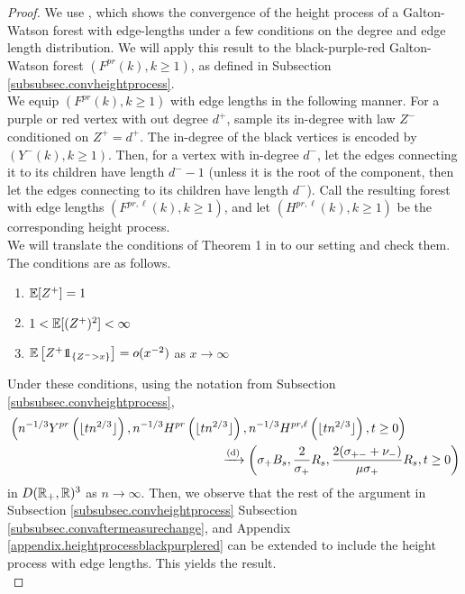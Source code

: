 \begin{proof}
We use \citet[Theorem 1]{deraphelisScalingLimitMultitype2017}, which shows the convergence of the height process of a Galton-Watson forest with edge-lengths under a few conditions on the degree and edge length distribution. We will apply this result to the black-purple-red Galton-Watson forest $(F^{pr}(k),k\geq 1)$, as defined in Subsection \ref{subsubsec.convheightprocess}. \\
We equip $(F^{pr}(k),k\geq 1)$ with edge lengths in the following manner. For a purple or red vertex with out degree $d^+$, sample its in-degree with law $Z^-$ conditioned on $Z^+=d^+$. The in-degree of the black vertices is encoded by $(Y^{-}(k),k\geq 1)$.  Then, for a vertex with in-degree $d^-$, let the edges connecting it to its children have length $d^--1$ (unless it is the root of the component, then let the edges connecting to its children have length $d^-$). Call the resulting forest with edge lengths $(F^{pr,\ell}(k),k\geq 1)$, and let $(H^{pr,\ell}(k),k\geq 1)$ be the corresponding height process.\\
We will translate the conditions of Theorem 1 in \cite{deraphelisScalingLimitMultitype2017} to our setting and check them. The conditions are as follows.
\begin{enumerate}
    \item ${\mathbb E}[Z^+]=1$
    \item $1<{\mathbb E}[(Z^+)^2]<\infty$
    \item $\E\left[Z^+\one_{\{Z^->x\}}\right]=o(x^{-2})$ as $x\to \infty$
\end{enumerate}
Under these conditions, using the notation from Subsection \ref{subsubsec.convheightprocess},
\begin{align}
    \label{eq.convmodifiedheightprocess}
    &\left(n^{-1/3}Y^{pr}\left(\lfloor t n^{2/3}\rfloor \right),n^{-1/3}H^{pr}\left(\lfloor t n^{2/3}\rfloor \right), n^{-1/3}H^{pr,\ell}\left(\lfloor t n^{2/3}\rfloor \right),t\geq 0\right) \nonumber \\
    &\hspace{17em} \todist\left(\sigma_+ B_s, \frac{2}{\sigma_+}R_s, \frac{2(\sigma_{+-}+\nu_-)}{\mu\sigma_+}R_s,t\geq 0\right)
\end{align}
in $D({\mathbb R}_+,{\mathbb R})^3$ as $n\to \infty$. 
Then, we observe that the rest of the argument in Subsection \ref{subsubsec.convheightprocess} Subsection \ref{subsubsec.convaftermeasurechange}, and Appendix \ref{appendix.heightprocessblackpurplered} can be extended to include the height process with edge lengths. This yields the result.\\

\end{proof}
